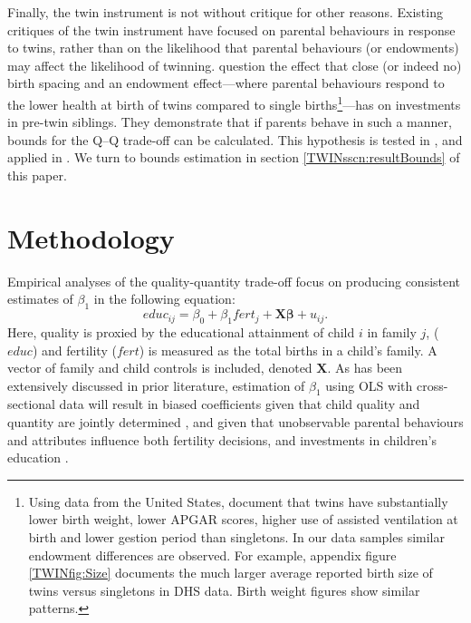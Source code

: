 \documentclass[subeqn]{article}
\begin{document}
\begin{spacing}{1.4}
Finally, the twin instrument is not without critique for other reasons. Existing
critiques of the twin instrument have focused on parental behaviours in response 
to twins, rather than on the likelihood that parental behaviours (or endowments) 
may affect the likelihood of twinning. \citet{RosenzweigZhang2009} question the 
effect that close (or indeed no) birth spacing and an endowment effect---where 
parental behaviours respond to the lower health at birth of twins compared to 
single births\footnote{Using data from the United States, \citet{Almondetal2005} 
document that twins have substantially lower birth weight, lower APGAR scores, 
higher use of assisted ventilation at birth and lower gestion period than 
singletons. In our data samples similar endowment differences are observed. For
example, appendix figure \ref{TWINfig:Size} documents the much larger average 
reported birth size of twins versus singletons in DHS data. Birth weight figures 
show similar patterns.}---has on investments in pre-twin siblings. They 
demonstrate that if parents behave in such a manner, bounds for the Q--Q 
trade-off can be calculated. This hypothesis is tested in 
\citet{Angristetal2010}, and applied in \citet{FitzsimonsMalde2014}.  We turn
to bounds estimation in section \ref{TWINsscn:resultBounds} of this paper.

\section{Methodology}                              \label{TWINscn:method}
Empirical analyses of the quality-quantity trade-off focus on producing 
consistent estimates of $\beta_1$ in the following equation:
\begin{equation}
\label{TWINeqn:RF}
educ_{ij}=\beta_0+\beta_1 fert_{j} + \bm{X}\bm{\beta}+u_{ij}.
\end{equation}
Here, quality is proxied by the educational attainment of child $i$ in family 
$j$, ($educ$) and fertility ($fert$) is measured as the total births in a child's
family.  A vector of family and child controls is included, denoted $\bm{X}$.  As
has been extensively discussed in prior literature, estimation of $\beta_1$ using
OLS with cross-sectional data will result in biased coefficients given that child 
quality and quantity are jointly determined \citep{BeckerLewis1973,
BeckerTomes1976}, and given that unobservable parental behaviours and attributes 
influence both fertility decisions, and investments in children's education 
\citep{Qian2009}.


\end{spacing}
\end{document}
